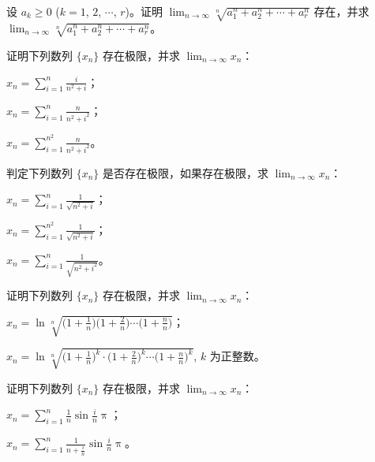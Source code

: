 	\begin{ti}
		设 $a_k \geq 0$ ($k=1$, $2$, $\cdots$, $r$)。证明 $\lim_{n \to \infty} \sqrt[n]{a_1^n + a_2^n + \cdots + a_r^n}$ 存在，并求 $\lim_{n \to \infty} \sqrt[n]{a_1^n + a_2^n + \cdots + a_r^n}$。
	\end{ti}

	\begin{ti}
		证明下列数列 $\{x_n\}$ 存在极限，并求 $\lim_{n \to \infty} x_n$：
		\begin{xiaoti}
			\item $x_n = \sum_{i=1}^{n} \frac{i}{n^2+i}$；
			\item \xing{} $x_n = \sum_{i=1}^{n} \frac{n}{n^2+i^2}$；
			\item \xing{} $x_n = \sum_{i=1}^{n^2} \frac{n}{n^2+i^2}$。
		\end{xiaoti}
	\end{ti}

	\begin{ti}
		判定下列数列 $\{x_n\}$ 是否存在极限，如果存在极限，求 $\lim_{n \to \infty} x_n$：
		\begin{xiaoti}
			\item $x_n = \sum_{i=1}^{n} \frac{1}{\sqrt{n^2+i}}$；
			\item $x_n = \sum_{i=1}^{n^2} \frac{1}{\sqrt{n^2+i}}$；
			\item \xing{} $x_n = \sum_{i=1}^{n} \frac{1}{\sqrt{n^2+i^2}}$。
		\end{xiaoti}
	\end{ti}

	\begin{ti}\xing{}
		证明下列数列 $\{x_n\}$ 存在极限，并求 $\lim_{n \to \infty} x_n$：
		\begin{xiaoti}
			\item $x_n = \ln \sqrt[n]{\bigl( 1 + \frac{1}{n} \bigr) \bigl( 1 + \frac{2}{n} \bigr) \cdots \bigl( 1 + \frac{n}{n} \bigr)}$；
			\item $x_n = \ln \sqrt[n]{\bigl( 1 + \frac{1}{n} \bigr)^k \cdot \bigl( 1 + \frac{2}{n} \bigr)^k \cdots \bigl( 1 + \frac{n}{n} \bigr)^k}$, $k$ 为正整数。
		\end{xiaoti}
	\end{ti}

	\begin{ti}\xing{}
		证明下列数列 $\{x_n\}$ 存在极限，并求 $\lim_{n \to \infty} x_n$：
		\begin{xiaoti}
			\item $x_n = \sum_{i=1}^n \frac{1}{n} \sin \frac{i}{n} \uppi$；
			\item $x_n = \sum_{i=1}^n \frac{1}{n+\frac{i}{n}} \sin \frac{i}{n} \uppi$。
		\end{xiaoti}
	\end{ti}

